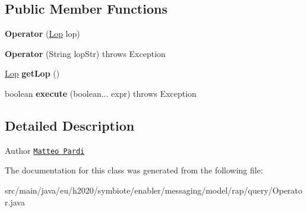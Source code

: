 \subsection*{Public Member Functions}
\begin{DoxyCompactItemize}
\item 
\mbox{\label{classeu_1_1h2020_1_1symbiote_1_1enabler_1_1messaging_1_1model_1_1rap_1_1query_1_1Operator_a5b6e2c39522b3dbf83dc1e31ac0bd76e}} 
{\bfseries Operator} (\hyperlink{enumeu_1_1h2020_1_1symbiote_1_1enabler_1_1messaging_1_1model_1_1rap_1_1query_1_1Operator_1_1Lop}{Lop} lop)
\item 
\mbox{\label{classeu_1_1h2020_1_1symbiote_1_1enabler_1_1messaging_1_1model_1_1rap_1_1query_1_1Operator_acad0d4835fef1f6c5da7efce439e2db4}} 
{\bfseries Operator} (String lop\+Str)  throws Exception 
\item 
\mbox{\label{classeu_1_1h2020_1_1symbiote_1_1enabler_1_1messaging_1_1model_1_1rap_1_1query_1_1Operator_aba728634655d9c0ae69e6f54a160b411}} 
\hyperlink{enumeu_1_1h2020_1_1symbiote_1_1enabler_1_1messaging_1_1model_1_1rap_1_1query_1_1Operator_1_1Lop}{Lop} {\bfseries get\+Lop} ()
\item 
\mbox{\label{classeu_1_1h2020_1_1symbiote_1_1enabler_1_1messaging_1_1model_1_1rap_1_1query_1_1Operator_ad4807662ac50f96ebce9afbaec595265}} 
boolean {\bfseries execute} (boolean... expr)  throws Exception 
\end{DoxyCompactItemize}


\subsection{Detailed Description}
\begin{DoxyAuthor}{Author}
\href{mailto:m.pardi@nextworks.it}{\tt Matteo Pardi} 
\end{DoxyAuthor}


The documentation for this class was generated from the following file\+:\begin{DoxyCompactItemize}
\item 
src/main/java/eu/h2020/symbiote/enabler/messaging/model/rap/query/Operator.\+java\end{DoxyCompactItemize}

